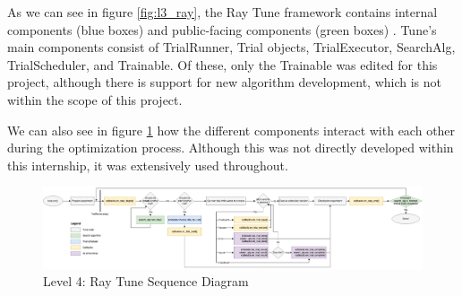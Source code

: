 As we can see in figure \ref{fig:l3_ray}, the Ray Tune framework contains internal components (blue boxes) and public-facing components (green boxes) \parencite{ray}. Tune’s main components consist of TrialRunner, Trial objects, TrialExecutor, SearchAlg, TrialScheduler, and Trainable. Of these, only the Trainable was edited for this project, although there is support for new algorithm development, which is not within the scope of this project.

We can also see in figure \ref{fig:l3_ray_seq} how the different components interact with each other during the optimization process. Although this was not directly developed within this internship, it was extensively used throughout.

\begin{figure}
\centering
\includegraphics[width=\textwidth, keepaspectratio]{images/tune_component_flwo.png}
\caption{Level 4: Ray Tune Sequence Diagram \parencite{ray}}
\label{fig:l3_ray_seq}
\end{figure}